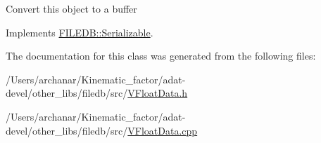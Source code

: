 Convert this object to a buffer 

Implements \mbox{\hyperlink{classFILEDB_1_1Serializable_a8deaa86e108c08c863881e46cf5578ea}{F\+I\+L\+E\+D\+B\+::\+Serializable}}.



The documentation for this class was generated from the following files\+:\begin{DoxyCompactItemize}
\item 
/\+Users/archanar/\+Kinematic\+\_\+factor/adat-\/devel/other\+\_\+libs/filedb/src/\mbox{\hyperlink{adat-devel_2other__libs_2filedb_2src_2VFloatData_8h}{V\+Float\+Data.\+h}}\item 
/\+Users/archanar/\+Kinematic\+\_\+factor/adat-\/devel/other\+\_\+libs/filedb/src/\mbox{\hyperlink{adat-devel_2other__libs_2filedb_2src_2VFloatData_8cpp}{V\+Float\+Data.\+cpp}}\end{DoxyCompactItemize}
